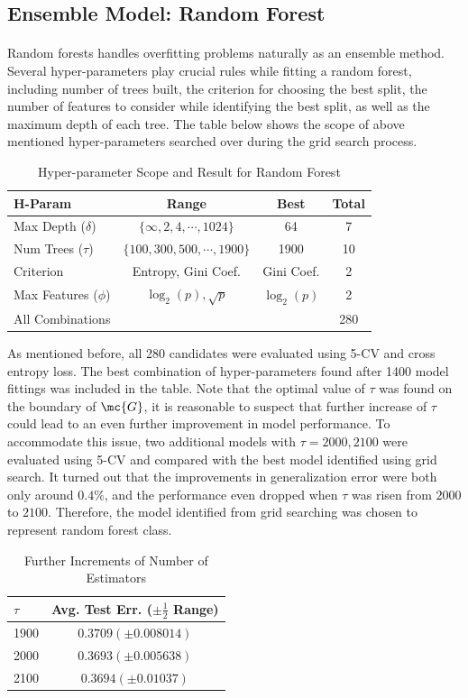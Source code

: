 \documentclass[11pt]{article}
\begin{document}
 	\subsection{Ensemble Model: Random Forest}
 	\paragraph{} Random forests handles overfitting problems naturally as an ensemble method. Several hyper-parameters play crucial rules while fitting a random forest, including number of trees built, the criterion for choosing the best split, the number of features to consider while identifying the best split, as well as the maximum depth of each tree. The table below shows the scope of above mentioned hyper-parameters searched over during the grid search process.
 	\begin{table}[H]
 		\centering
 		\begin{tabular}{l|c|c|c}
 		H-Param & Range & Best & Total \\
 		\hline
 		Max Depth ($\delta$) & $\{\infty, 2, 4, \cdots, 1024\}$ & 64 & 7 \\
 		Num Trees ($\tau$) & $\{100, 300, 500, \cdots, 1900\}$ & 1900 & 10 \\
 		Criterion & Entropy, Gini Coef. & Gini Coef. & 2 \\
 		Max Features ($\phi$) & $\log_2(p), \sqrt{p}$ & $\log_2(p)$ & 2\\
 		\hline 
 		All Combinations& & & 280
		\end{tabular}
		\caption{Hyper-parameter Scope and Result for Random Forest}
 	\end{table}
 	As mentioned before, all 280 candidates were evaluated using 5-CV and cross entropy loss. The best combination of hyper-parameters found after 1400 model fittings was included in the table. Note that the optimal value of $\tau$ was found on the boundary of $\mc{G}$, it is reasonable to suspect that further increase of $\tau$ could lead to an even further improvement in model performance. To accommodate this issue, two additional models with $\tau=2000, 2100$ were evaluated using 5-CV and compared with the best model identified using grid search. It turned out that the improvements in generalization error were both only around $0.4\%$, and the performance even dropped when $\tau$ was risen from $2000$ to $2100$. Therefore, the model identified from grid searching was chosen to represent random forest class.
 	
 	\begin{table}[H]
	 	\centering
		\begin{tabular}{l|c}
			$\tau$ & Avg. Test Err. ($\pm \frac{1}{2}$ Range) \\
			\hline
			1900 & $0.3709(\pm 0.008014)$ \\
			2000 & $0.3693(\pm 0.005638)$ \\
			2100 & $0.3694(\pm 0.01037)$ 
		\end{tabular}
		\caption{Further Increments of Number of Estimators}
	\end{table}
 
\end{document}
